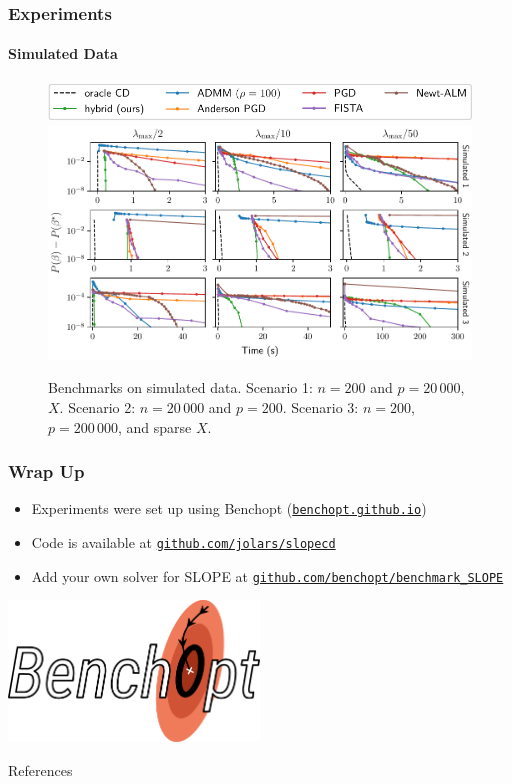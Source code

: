 \begin{frame}
  \frametitle{Experiments}
  \framesubtitle{Simulated Data}

  \begin{figure}[htpb]
    \centering
    \includegraphics[scale=0.55]{figures/simulated_legend.pdf}
    \includegraphics[scale=0.6]{figures/simulated.pdf}
    \caption{%
      Benchmarks on simulated data. Scenario 1: \(n = 200\) and \(p = 20\,000\),
      \(X\). Scenario 2: \(n = 20\,000\) and \(p = 200\). Scenario 3: \(n = 200\),
      \(p = 200\,000\), and sparse \(X\).
    }
  \end{figure}
\end{frame}

\begin{frame}[c]
  \frametitle{Wrap Up}

  \begin{itemize}
    \item Experiments were set up using Benchopt
          (\href{https://benchopt.github.io}{\texttt{benchopt.github.io}})
    \item Code is available at
          \href{https://github.com/jolars/slopecd}{\texttt{github.com/jolars/slopecd}}
    \item Add your own solver for SLOPE at
          \href{https://github.com/benchopt/benchmark\_SLOPE}{\texttt{github.com/benchopt/benchmark\_SLOPE}}
  \end{itemize}

  \vfill\hfill
  \includegraphics[width=0.5\textwidth]{figures/benchopt_logo.pdf}
\end{frame}

\begin{frame}[allowframebreaks]{References}
  \bibliographytrue
  \printbibliography[heading=none]
\end{frame}


